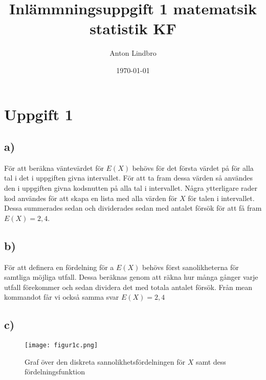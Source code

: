 \documentclass[a4paper]{article}
\title{Inlämmningsuppgift 1 matematsik statistik KF}
\author{Anton Lindbro}
\date{\today}
\begin{document}
\maketitle

\newpage

\tableofcontents

\newpage

\section{Uppgift 1}

\subsection{a)}

För att beräkna väntevärdet för $E(X)$ behövs för det första värdet på för alla tal i det i uppgiften givna intervallet. För att ta fram dessa värden så användes den i uppgiften givna kodsnutten på alla tal i intervallet. Några ytterligare rader kod användes för att skapa en lista med alla värden för $X$ för talen i intervallet. Dessa summerades sedan och dividerades sedan med antalet försök för att få fram $E(X) = 2,4$.

\subsection{b)}

För att definera en fördelning för a $E(X)$ behövs först sanolikheterna för samtliga möjliga utfall. Dessa beräknas genom att räkna hur många gånger varje utfall förekommer och sedan dividera det med totala antalet försök. Från mean kommandot får vi också samma svar $E(X) = 2,4$

\subsection{c)}

\begin{figure}[H]
    \begin{small}
        \begin{center}
            \texttt{[image: figur1c.png]}
        \end{center}
        \caption{Graf över den diskreta sannolikhetsfördelningen för $X$ samt dess fördelningsfunktion}
        \label{fig:1c}
    \end{small}
\end{figure}
\end{document}
